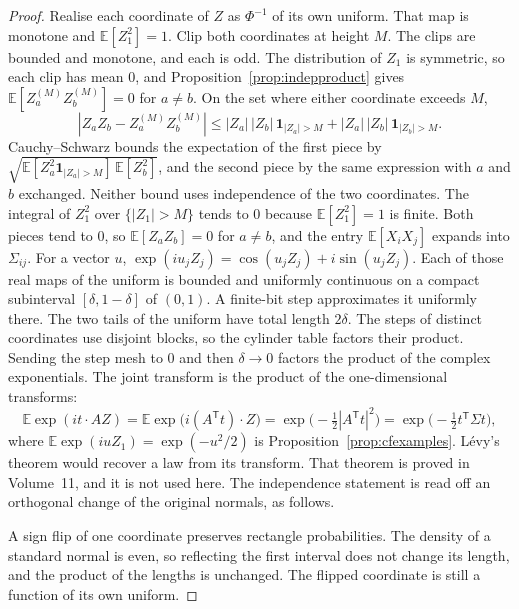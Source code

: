 \begin{proof}
Realise each coordinate of $Z$ as $\Phi^{-1}$ of its own uniform. That map is monotone and $\mathbb E[Z_1^2]=1$. Clip both coordinates at height $M$. The clips are bounded and monotone, and each is odd. The distribution of $Z_1$ is symmetric, so each clip has mean $0$, and Proposition~\ref{prop:indepproduct} gives $\mathbb E[Z_a^{(M)}Z_b^{(M)}]=0$ for $a\ne b$. On the set where either coordinate exceeds $M$,
\[
 |Z_a Z_b-Z_a^{(M)}Z_b^{(M)}|
 \le |Z_a|\,|Z_b|\,\mathbf 1_{|Z_a|>M}+|Z_a|\,|Z_b|\,\mathbf 1_{|Z_b|>M}.
\]
Cauchy--Schwarz bounds the expectation of the first piece by $\sqrt{\mathbb E[Z_a^2\mathbf 1_{|Z_a|>M}]\,\mathbb E[Z_b^2]}$, and the second piece by the same expression with $a$ and $b$ exchanged. Neither bound uses independence of the two coordinates. The integral of $Z_1^2$ over $\{|Z_1|>M\}$ tends to $0$ because $\mathbb E[Z_1^2]=1$ is finite. Both pieces tend to $0$, so $\mathbb E[Z_a Z_b]=0$ for $a\ne b$, and the entry $\mathbb E[X_i X_j]$ expands into $\Sigma_{ij}$. For a vector $u$, $\exp(iu_j Z_j)=\cos(u_j Z_j)+i\sin(u_j Z_j)$. Each of those real maps of the uniform is bounded and uniformly continuous on a compact subinterval $[\delta,1-\delta]$ of $(0,1)$. A finite-bit step approximates it uniformly there. The two tails of the uniform have total length $2\delta$. The steps of distinct coordinates use disjoint blocks, so the cylinder table factors their product. Sending the step mesh to $0$ and then $\delta\to0$ factors the product of the complex exponentials. The joint transform is the product of the one-dimensional transforms:
\[
 \mathbb E\exp(it\cdot AZ)=\mathbb E\exp\bigl(i(A^{\mathsf T}t)\cdot Z\bigr)=\exp\bigl(-\tfrac12|A^{\mathsf T}t|^2\bigr)=\exp\bigl(-\tfrac12 t^{\mathsf T}\Sigma t\bigr),
\]
where $\mathbb E\exp(iuZ_1)=\exp(-u^2/2)$ is Proposition~\ref{prop:cfexamples}. L\'evy's theorem would recover a law from its transform. That theorem is proved in Volume~11, and it is not used here. The independence statement is read off an orthogonal change of the original normals, as follows.

A sign flip of one coordinate preserves rectangle probabilities. The density of a standard normal is even, so reflecting the first interval does not change its length, and the product of the lengths is unchanged. The flipped coordinate is still a function of its own uniform.


\end{proof}
